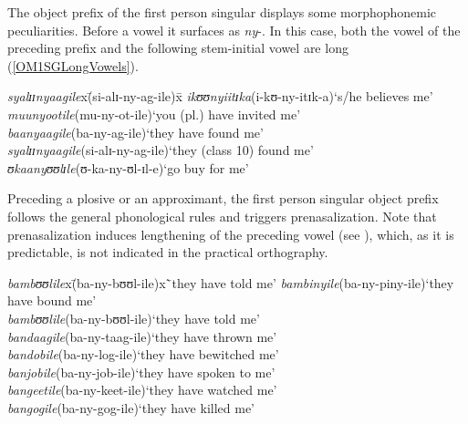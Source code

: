 The object prefix of the first person singular displays some morphophonemic peculiarities. Before a vowel it surfaces as \textit{ny}-. In this case, both the vowel of the preceding prefix and the following stem-initial vowel are long (\ref{OM1SGLongVowels}).


\begin{exe}
	\ex\label{OM1SGLongVowels}
	\begin{tabbing}
		\textit{syalɪɪnyaagile}x\=(\degree si-alɪ-ny-ag-ile)x\=\kill
		\textit{ikʊʊnyiitɪka}\>(\degree i-kʊ-ny-itɪk-a)\>`s/he believes me'\\
		\textit{muunyootile}\>(\degree mu-ny-ot-ile)\>`you (pl.) have invited me' \\
		\textit{baanyaagile}\>(\degree ba-ny-ag-ile)\>`they have found me'\\
		\textit{syalɪɪnyaagile}\>(\degree si-alɪ-ny-ag-ile)\>`they (class 10) found me'\\
		\textit{ʊkaanyʊʊlɪle}\>(\degree ʊ-ka-ny-ʊl-ɪl-e)\>`go buy for me'
	\end{tabbing}
\end{exe} 

Preceding a plosive or an approximant, the first person singular object prefix follows the general phonological rules and triggers prenasalization. Note that prenasalization induces lengthening of the preceding vowel (see ), which, as it is predictable, is not indicated in the practical orthography.
\begin{exe}
	\ex
	\begin{tabbing}
		\textit{bambʊʊlile}x\=(\degree ba-ny-bʊʊl-ile)x\=`they have told me'\kill
		\textit{bambinyile}\>(\degree ba-ny-piny-ile)\>`they have bound me'\\
		\textit{bambʊʊlile}\>(\degree ba-ny-bʊʊl-ile)\>`they have told me'\\
		\textit{bandaagile}\>(\degree ba-ny-taag-ile)\>`they have thrown me'\\
		\textit{bandobile}\>(\degree ba-ny-log-ile)\>`they have bewitched me'\\
		\textit{banjobile}\>(\degree ba-ny-job-ile)\>`they have spoken to me'\\
		\textit{bangeetile}\>(\degree ba-ny-keet-ile)\>`they have watched me'\\
		\textit{bangogile}\>(\degree ba-ny-gog-ile)\>`they have killed me'
	\end{tabbing}
\end{exe}

